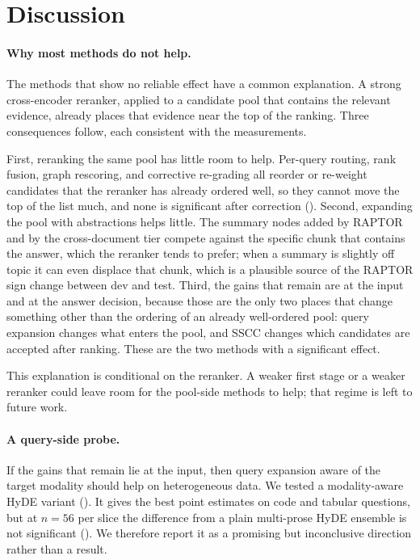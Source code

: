 \documentclass[10pt,twocolumn]{article}
\begin{document}
\section{Discussion}\label{sec:analysis}
\paragraph{Why most methods do not help.}
The methods that show no reliable effect have a common explanation. A strong
cross-encoder reranker, applied to a candidate pool that contains the relevant
evidence, already places that evidence near the top of the ranking. Three
consequences follow, each consistent with the measurements.

First, reranking the same pool has little room to help. Per-query routing, rank
fusion, graph rescoring, and corrective re-grading all reorder or re-weight
candidates that the reranker has already ordered well, so they cannot move the
top of the list much, and none is significant after correction ().
Second, expanding the pool with abstractions helps little. The summary nodes
added by RAPTOR and by the cross-document tier compete against the specific chunk
that contains the answer, which the reranker tends to prefer; when a summary is
slightly off topic it can even displace that chunk, which is a plausible
source of the RAPTOR sign change between dev and test. Third, the gains that
remain are at the input and at the answer decision, because those are the only
two places that change something other than the ordering of an already
well-ordered pool: query expansion changes what enters the pool, and SSCC changes
which candidates are accepted after ranking. These are the two methods with a
significant effect.

This explanation is conditional on the reranker. A weaker first stage or a weaker
reranker could leave room for the pool-side methods to help; that regime is
left to future work.

\paragraph{A query-side probe.}
If the gains that remain lie at the input, then query expansion aware of the
target modality should help on heterogeneous data. We tested a modality-aware
HyDE variant (). It gives the best point estimates on code
and tabular questions, but at $n{=}56$ per slice the difference from a plain
multi-prose HyDE ensemble is not significant (). We therefore
report it as a promising but inconclusive direction rather than a result.
\end{document}
